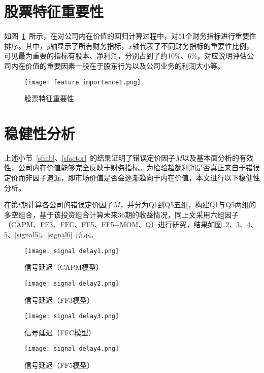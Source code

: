 \section{股票特征重要性}
如图~\ref{feature}~所示，在对公司内在价值的回归计算过程中，对51个财务指标进行重要性排序。其中，$y$轴显示了所有财务指标，$x$轴代表了不同财务指标的重要性比例，可见最为重要的指标有股本、净利润，分别占到了约10\%、6\%，对应说明评估公司内在价值的重要因素一般在于股东行为以及公司业务的利润大小等。

\begin{figure}[htbp]
  \centering
    \texttt{[image: feature importance1.png]}
    \caption{股票特征重要性}
    \label{feature}
\end{figure}

\section{稳健性分析}
上述小节~\ref{sfmb}、\ref{sfactor}~的结果证明了错误定价因子$M$以及基本面分析的有效性，公司内在价值能够完全反映于财务指标。为检验超额利润是否真正来自于错误定价而非因子遗漏，即市场价值是否会逐渐趋向于内在价值，本文进行以下稳健性分析。

在第$t$期计算各公司的错误定价因子$M$，并分为Q1到Q5五组，构建Q1与Q5两组的多空组合，基于该投资组合计算未来36期的收益情况，同上文采用六组因子（CAPM、FF3、FFC、FF5、FF5+MOM、Q）进行研究，结果如图~\ref{signal1}、\ref{signal2}、\ref{signal3}、\ref{signal4}、\ref{signal5}、\ref{signal6}~所示。

\begin{figure}[htbp]
  \centering
    \texttt{[image: signal delay1.png]}
    \caption{信号延迟（CAPM模型）}
    \label{signal1}
\end{figure}
     
\begin{figure}[htbp]
  \centering
    \texttt{[image: signal delay2.png]}
    \caption{信号延迟（FF3模型）}
    \label{signal2}
\end{figure}

\begin{figure}[htbp]
  \centering
    \texttt{[image: signal delay3.png]}
    \caption{信号延迟（FFC模型）}
    \label{signal3}
\end{figure}
  
\begin{figure}[htbp]
  \centering
    \texttt{[image: signal delay4.png]}
    \caption{信号延迟（FF5模型）}
    \label{signal4}
\end{figure}


